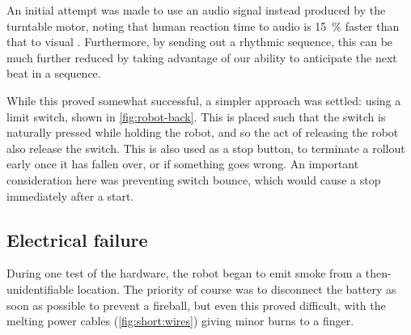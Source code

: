 \documentclass[main.tex]{subfiles}
\begin{document}
	An initial attempt was made to use an audio signal instead produced by the turntable motor, noting that human reaction time to audio is \SI{15}{\percent} faster than that to visual \cite{reaction}.
	Furthermore, by sending out a rhythmic sequence, this can be much further reduced by taking advantage of our ability to anticipate the next beat in a sequence.

	While this proved somewhat successful, a simpler approach was settled: using a limit switch, shown in \cref{fig:robot-back}.
	This is placed such that the switch is naturally pressed while holding the robot, and so the act of releasing the robot also release the switch.
	This is also used as a stop button, to terminate a rollout early once it has fallen over, or if something goes wrong\footnotemark.
	An important consideration here was preventing switch bounce, which would cause a stop immediately after a start.


\subsection{Electrical failure}
	\label{sec:electrical:failure}

	During one test of the hardware, the robot began to emit smoke from a then-unidentifiable location. The priority of course was to disconnect the battery as soon as possible to prevent a fireball, but even this proved difficult, with the melting power cables (\cref{fig:short:wires}) giving minor burns to a finger.
\end{document}
